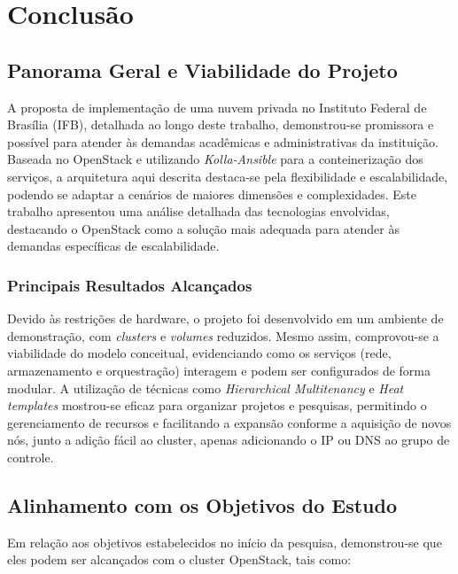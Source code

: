 \chapter{Conclusão}


\section{Panorama Geral e Viabilidade do Projeto}
A proposta de implementação de uma nuvem privada no Instituto Federal de Brasília (IFB), detalhada ao longo deste trabalho, demonstrou-se promissora e possível para atender às demandas acadêmicas e administrativas da instituição. Baseada no OpenStack e utilizando \textit{Kolla-Ansible} para a conteinerização dos serviços, a arquitetura aqui descrita destaca-se pela flexibilidade e escalabilidade, podendo se adaptar a cenários de maiores dimensões e complexidades. Este trabalho apresentou uma análise detalhada das tecnologias envolvidas, destacando o OpenStack como a solução mais adequada para atender às demandas específicas de escalabilidade.

\subsection{Principais Resultados Alcançados}
Devido às restrições de hardware, o projeto foi desenvolvido em um ambiente de demonstração, com \textit{clusters} e \textit{volumes} reduzidos. Mesmo assim, comprovou-se a viabilidade do modelo conceitual, evidenciando como os serviços (rede, armazenamento e orquestração) interagem e podem ser configurados de forma modular. A utilização de técnicas como \textit{Hierarchical Multitenancy} e \textit{Heat templates} mostrou-se eficaz para organizar projetos e pesquisas, permitindo o gerenciamento de recursos e facilitando a expansão conforme a aquisição de novos nós, junto a adição fácil ao cluster, apenas adicionando o IP ou DNS ao grupo de controle. 

\section{Alinhamento com os Objetivos do Estudo}
Em relação aos objetivos estabelecidos no início da pesquisa, demonstrou-se que eles podem ser alcançados com o cluster OpenStack, tais como:

